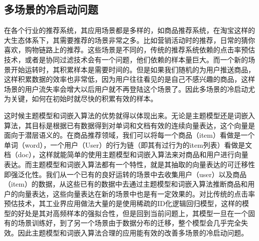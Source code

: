\subsection{多场景的冷启动问题}
在各个行业的推荐系统，其应用场景都是多样的，如商品推荐系统，在淘宝这样的大生态体系下，其需要推荐的场景非常之多。比如营销活动时的推荐，日常的猜你喜欢，购物链路上的推荐。这些场景是不同的，传统的推荐系统依赖的点击率预估技术，或者是协同过滤技术会有一个问题，他们依赖的样本量巨大。而一个新的场景开始运转时，其积累样本是需要时间的。但是如果我们随机的为用户推送商品，这样积累数据的效率也非常低，因为用户往往看见的是自己不感兴趣的商品，这样场景的用户流失率会增大以后用户就不再登陆这个场景了。因此多场景的冷启动尤为关键，如何在初始时就尽快的积累有效的样本。

这时候主题模型和词嵌入算法的优势就得以体现出来。无论是主题模型还是词嵌入算法，其目标是根据已有数据得到对单词和文档有效的连续向量表达，这个向量是面向于潜层语义的。在商品推荐领域，我们可以将每一个商品（item）看做是一个单词（word），一个用户（User）的行为链（即其有过行为的item列表）看做是文档（doc），这样就能简单的使用主题模型和词嵌入算法来对商品和用户进行向量表达。而主题模型和词嵌入算法都有一个特性，就是其抽取的向量表达的可迁移性即强泛化性。我们从一个已有的良好运转的场景中去收集用户（user）以及商品（item）的数据，从这些已有的数据中去通过主题模型和词嵌入算法推断商品和用户的向量表达，这些向量表达在新的场景中也是有一定效果的。对比传统的点击率预估技术，其工业界应用做法大量的是使用稀疏的ID化逻辑回归模型，这样的模型的好处是其对高频样本的强拟合性，但是回到当前问题上，其模型一旦在一个固有的场景训练好，到了另一个场景由于数据分布的迁移，整个模型会几乎完全失效。因此主题模型和词嵌入算法合理的应用能有效的改善多场景的冷启动问题。

